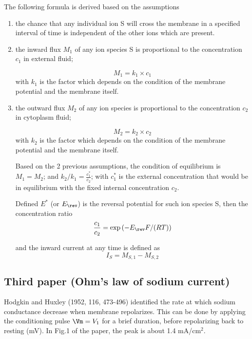 The following formula is derived based on the assumptions
\begin{enumerate}

  \item the chance that any individual ion S will cross the membrane in a
  specified interval of time is independent of the other ions which are
  present.

  \item the inward flux $M_1$ of any ion species S is proportional to the
  concentration $c_1$ in external fluid;

\begin{equation}
M_1 = k_1 \times c_1
\end{equation}  
with $k_1$ is the factor which depends on the condition of the membrane
potential and the membrane itself.

  \item the outward flux $M_2$ of any ion species is proportional to the
  concentration $c_2$ in cytoplasm fluid; 

\begin{equation}
M_2 = k_2 \times c_2
\end{equation}  
with $k_2$ is the factor which depends on the condition of the membrane
potential and the membrane itself.

  Based on the 2 previous assumptions, the condition of equilibrium is
  $M_1=M_2$; and $k_2/k_1 = \frac{c_1^{*}}{c_2}$; with $c_1^{*}$
  is the external concentration that would be in equilibrium with the fixed
  internal concentration $c_2$.
  
    Defined $E^{*}$ (or $E_\rev$) is the reversal potential for such ion species
   S, then the concentration ratio
\begin{equation}
\frac{c_1}{c_2} = \exp\left( - E_\rev F/(RT)\right)
\end{equation}
  
  and the inward current at any time is defined as
  \begin{equation}
  I_S = M_{S,1} - M_{S,2}
  \end{equation}

\end{enumerate}


\subsection{Third paper (Ohm's law of sodium current)}
\label{sec:Hodgkin-Huxley-third-paper}

Hodgkin and Huxley (1952, 116, 473-496)  identified the rate at which sodium
conductance decrease when membrane repolarizes. This can be done by applying the
conditioning pulse $\Vm=V_1$ for a brief duration, before repolarizing back to
resting (mV). In Fig.1 of the paper, the peak is about 1.4 mA/cm$^2$. 

